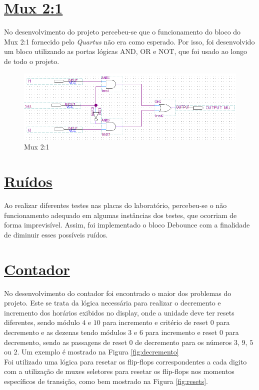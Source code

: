 \documentclass[14pt, oneside]{book}
\newcommand\tab[1][1cm]{\hspace*{#1}}
\theoremstyle{definition}
\begin{document}
            \section[Mux 2:1]{\hyperlink{toc}{Mux 2:1}}
                \tab No desenvolvimento do projeto percebeu-se que o funcionamento do bloco do Mux 2:1 fornecido pelo \textit{Quartus} não era como esperado. Por isso, foi desenvolvido um bloco utilizando as portas lógicas AND, OR e NOT, que foi usado ao longo de todo o projeto.
                
                \begin{figure}[!h]
                    \centering
                    \includegraphics[scale=1]{mux21.png}
                    \caption{Mux 2:1}
                    \label{fig:mux21}
                \end{figure}
            
            \section[Ruídos]{\hyperlink{toc}{Ruídos}}
                \tab Ao realizar diferentes testes nas placas do laboratório, percebeu-se o não funcionamento adequado em algumas instâncias dos testes, que ocorriam de forma imprevisível. Assim, foi implementado o bloco Debounce com a finalidade de diminuir esses possíveis ruídos.
            
            \section[Contador]{\hyperlink{toc}{Contador}}
                \tab No desenvolvimento do contador foi encontrado o maior dos problemas do projeto. Este se trata da lógica necessária para realizar o decremento e incremento dos horários exibidos no display, onde a unidade deve ter resets diferentes, sendo módulo $4$ e $10$ para incremento e critério de reset $0$ para decremento e as dezenas tendo módulos $3$ e $6$ para incremento e reset $0$ para decremento, sendo as passagens de reset $0$ de decremento para os números $3$, $9$, $5$ ou $2$. Um exemplo é mostrado na Figura \ref{fig:decremento} \\
               \tab Foi utilizado uma lógica para resetar os flip-flops correspondentes a cada digito com a utilização de muxes seletores para resetar os flip-flops nos momentos específicos de transição, como bem mostrado na Figura \ref{fig:resets}.
                
\end{document}
